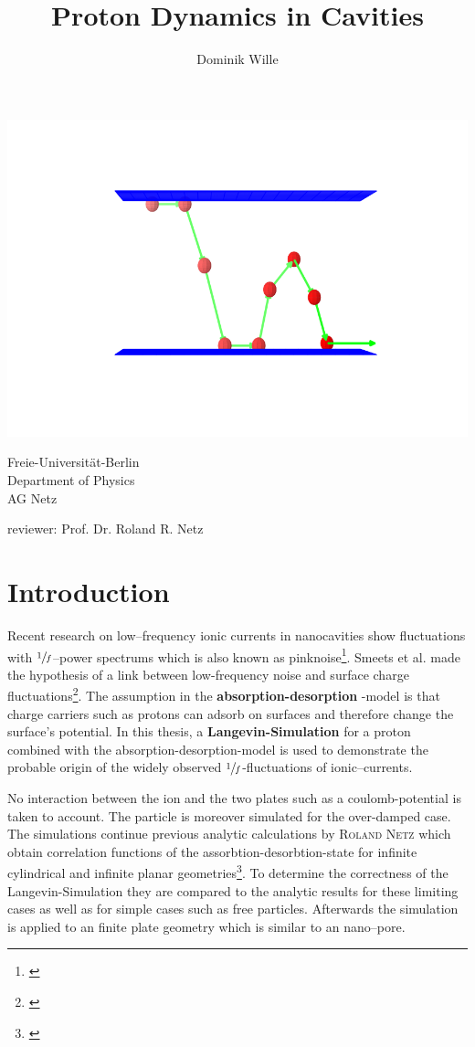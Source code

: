 \documentclass[a4paper, parskip=half]{scrartcl}
\title{Proton Dynamics in Cavities}
\author{Dominik Wille}
\newcommand{\person}[1]{%
	\textsc{#1}%
}
\newcommand{\effect}[1]{%
	\textbf{#1}%
}
\newcommand{\myCite}[1]{\footnote{\cite{#1} \citeauthor{#1} \citetitle{#1} \citeyear{#1}}}
\begin{document}
\maketitle

\includegraphics[width=\textwidth]{img/title}

\vfill

\enlargethispage{2cm}
  \parbox[t]{0.45\textwidth}{%
   Freie-Universität-Berlin\\
   Department of Physics\\
   AG Netz
  }
  \parbox[t]{0.55\textwidth}{\raggedleft%
     reviewer: Prof. Dr. Roland R. Netz
  }

\thispagestyle{empty}
\newpage
\tableofcontents
\thispagestyle{empty}
\newpage

\section{Introduction}%
Recent research on low--frequency ionic currents in nanocavities show fluctuations with $\sfrac{1}{f}$--power spectrums which is also known as pinknoise\myCite{pinknoise}. Smeets et al. made the hypothesis of a link between low-frequency noise and surface charge fluctuations\myCite{paper0}. The assumption in the \effect{absorption-desorption}-model is that charge carriers such as protons can adsorb on surfaces and therefore change the surface's potential. In this thesis, a \effect{Langevin-Simulation} for a proton combined with the absorption-desorption-model is used to demonstrate the probable origin of the widely observed $\sfrac{1}{f}$-fluctuations of ionic--currents.

No interaction between the ion and the two plates such as a coulomb-potential is taken to account. The particle is moreover simulated for the over-damped case. The simulations continue previous analytic calculations by \person{Roland Netz} which obtain correlation functions of the assorbtion-desorbtion-state for infinite cylindrical and infinite planar geometries\myCite{netzpaper}. To determine the correctness of the Langevin-Simulation they are compared to the analytic results for these limiting cases as well as for simple cases such as free particles. Afterwards the simulation is applied to an finite plate geometry which is similar to an nano--pore.
\end{document}
